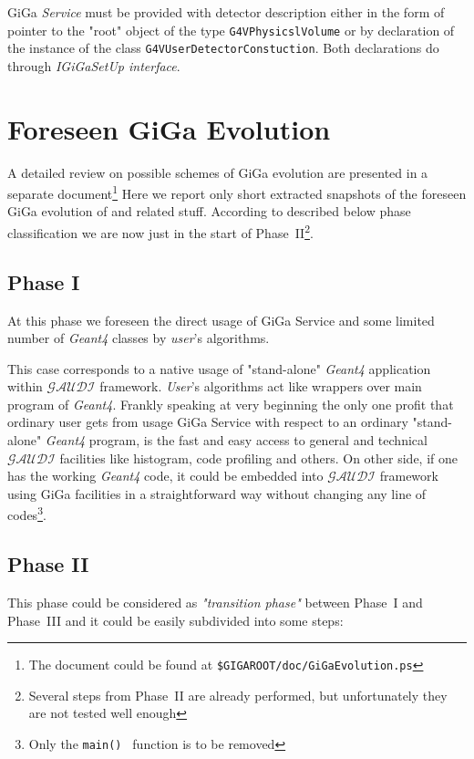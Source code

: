\documentclass[nfss,times,12pt,a4paper]{article}
\begin{document}
{{\sc GiGa} {\it Service} must be provided with 
detector description either in the form of 
pointer to the "root" object of the type 
{\tt G4VPhysicslVolume} or by 
declaration of the instance of the class 
{\tt G4VUserDetectorConstuction}. Both declarations 
do through {\it IGiGaSetUp interface}.  

\section{ Foreseen {\sc GiGa} Evolution } 
A detailed review on possible schemes of {\sc GiGa} evolution 
are presented in a separate document\footnote{The document could be found at {\tt \$GIGAROOT/doc/GiGaEvolution.ps} }
Here we  report only short extracted snapshots of the foreseen 
{\sc GiGa} evolution of and related stuff. According to described
below  phase classification we are now just in the start of 
Phase~II\footnote{Several steps from Phase~II are already 
performed, but unfortunately they are not tested well enough}.  



\subsection{ Phase I  } 

At this phase we foreseen the 
direct usage of {\sc GiGa} Service 
and some limited number of 
{\it Geant4} classes 
by {\it user}'s  algorithms. 

This case corresponds to a native 
usage of "stand-alone" {\it Geant4} application 
within ${\mathcal{GAUDI}}$ framework. 
{\it User}'s algorithms act like wrappers over 
main program of {\it Geant4}.  
Frankly speaking at very beginning the only 
one profit that ordinary user gets from 
usage {\sc GiGa} Service with respect to 
an ordinary "stand-alone" {\it Geant4} program, 
is the fast and easy access to general and 
technical  ${\mathcal{GAUDI}}$ facilities 
like histogram, code profiling and others.  
 On other side, if one has the working 
{\it Geant4} code, it could be embedded into 
${\mathcal{GAUDI}}$ framework 
using {\sc GiGa} facilities in a straightforward 
way without changing 
any line of codes\footnote{Only the {\tt main() } function is to be removed}. 
   
\subsection{ Phase II  }
 
This phase could be considered as 
{\it "transition phase"}  between Phase~I and Phase~III and 
it could be easily subdivided into some steps:

}
\end{document}
